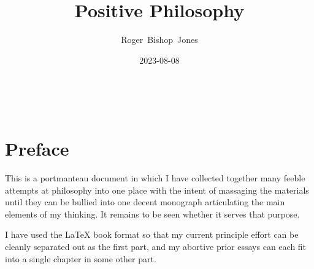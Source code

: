 \documentclass[10pt,titlepage]{book}
\title{Positive Philosophy}
\author{Roger~Bishop~Jones}
\date{\small 2023-08-08}
\newcommand{\ignore}[1]{}
\begin{document}

                               
\begin{titlepage}
\maketitle





\end{titlepage}

\ \

\ignore{
\begin{centering}
{}
\end{centering}
}%

\setcounter{tocdepth}{2}
{\parskip-0pt\tableofcontents}



\section{Preface}

This is a portmanteau document in which I have collected together many feeble attempts at philosophy into one place with the intent of massaging the materials until they can be bullied into one decent monograph articulating the main elements of my thinking.
It remains to be seen whether it serves that purpose.

I have used the \LaTeX{} book format so that my current principle effort can be cleanly separated out as the first part, and my abortive prior essays can each fit into a single chapter in some other part.
\end{document}
